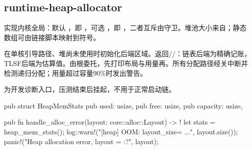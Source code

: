 
\subsection{runtime-heap-allocator}

实现内核全局：默认 ，即 ，可选 ，即 ，二者互斥由守卫。堆池大小来自；静态数组可由链接脚本映射到符号。

在单核引导路径、堆尚未使用时初始化后端区域。返回//：链表后端为精确记账，TLSF后端为估算值。由根委托，先打印布局与用量再。所有分配路径经关中断并检测递归分配；用量超过容量90\%时发出警告。

为开发诊断入口，压测结束后挂起，不用于正常启动链。

\begin{rustcode}
pub struct HeapMemStats {
    pub used: usize,
    pub free: usize,
    pub capacity: usize,
}

pub fn handle_alloc_error(layout: core::alloc::Layout) -> ! {
    let stats = heap_mem_stats();
    log::warn!("[heap] OOM: layout_size={} ...", layout.size());
    panic!("Heap allocation error, layout = {:?}", layout);
}
\end{rustcode}
